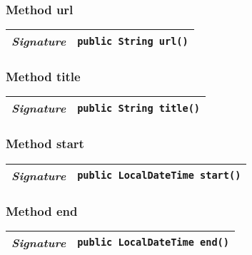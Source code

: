 \begin{adjustwidth}{1.5em}{0pt}
\begin{adjustwidth}{1.5em}{0pt}
\begin{adjustwidth}{1.5em}{0pt}
{\begin{tabularx}{1.0\linewidth}{@{}l R@{}}
      \end{tabularx}}
    \end{adjustwidth}\subsubsection{Method url\label{edu.kit.hci.soli.dto.CalendarEvent@url()}}
    \begin{adjustwidth}{1.5em}{0pt}
      {\begin{tabularx}{1.0\linewidth}{@{}l R@{}}
        \emph{Signature} & \texttt{public \texttt{String} url()} \\
        \hline
  
      \end{tabularx}}
    \end{adjustwidth}\subsubsection{Method title\label{edu.kit.hci.soli.dto.CalendarEvent@title()}}
    \begin{adjustwidth}{1.5em}{0pt}
      {\begin{tabularx}{1.0\linewidth}{@{}l R@{}}
        \emph{Signature} & \texttt{public \texttt{String} title()} \\
        \hline
  
      \end{tabularx}}
    \end{adjustwidth}\subsubsection{Method start\label{edu.kit.hci.soli.dto.CalendarEvent@start()}}
    \begin{adjustwidth}{1.5em}{0pt}
      {\begin{tabularx}{1.0\linewidth}{@{}l R@{}}
        \emph{Signature} & \texttt{public \texttt{LocalDateTime} start()} \\
        \hline
  
      \end{tabularx}}
    \end{adjustwidth}\subsubsection{Method end\label{edu.kit.hci.soli.dto.CalendarEvent@end()}}
    \begin{adjustwidth}{1.5em}{0pt}
      {\begin{tabularx}{1.0\linewidth}{@{}l R@{}}
        \emph{Signature} & \texttt{public \texttt{LocalDateTime} end()} \\
        \hline
  

\end{tabularx}}
\end{adjustwidth}
\end{adjustwidth}
\end{adjustwidth}
